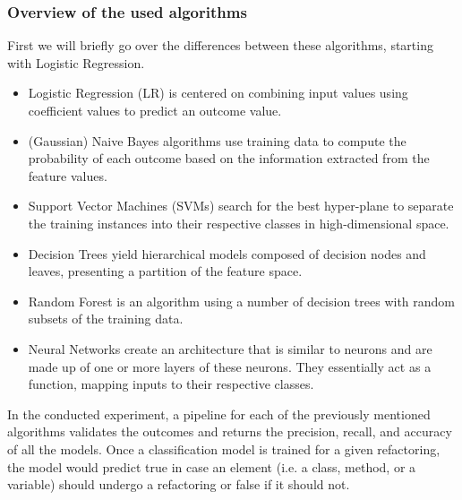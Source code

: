\subsubsection{Overview of the used algorithms}
First we will briefly go over the differences between these algorithms, starting with Logistic Regression.
\begin{itemize}
    \item Logistic Regression (LR) \cite{biship2007pattern} is centered on combining input values using coefficient values to predict an outcome value.
    \item (Gaussian) Naive Bayes algorithms \cite{zhang2014optimality} use training data to compute the probability of each outcome based on the information extracted from the feature values.
    \item Support Vector Machines (SVMs) \cite{cortes1995support} search for the best hyper-plane to separate the training instances into their respective classes in high-dimensional space.
    \item Decision Trees \cite{quinlan2014c4} yield hierarchical models composed of decision nodes and leaves, presenting a partition of the feature space.
    \item Random Forest \cite{breiman2001random} is an algorithm using a number of decision trees with random subsets of the training data.
    \item Neural Networks \cite{goodfellow2016deep} create an architecture that is similar to neurons and are made up of one or more layers of these neurons. They essentially act as a function, mapping inputs to their respective classes.
\end{itemize}
In the conducted experiment, a pipeline for each of the previously mentioned algorithms validates the outcomes and returns the precision, recall, and accuracy of all the models. Once a classification model is trained for a given refactoring, the model would predict true in case an element (i.e. a class, method, or a variable) should undergo a refactoring or false if it should not.
